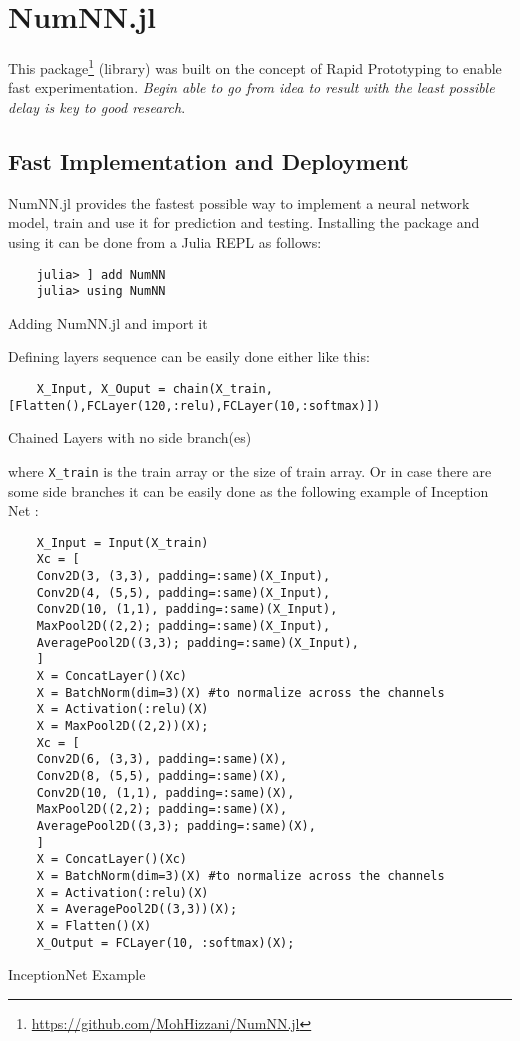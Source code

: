 \section{NumNN.jl}

This package\footnote{\href{https://github.com/MohHizzani/NumNN.jl}{https://github.com/MohHizzani/NumNN.jl}} (library) was built on the concept of Rapid Prototyping to enable fast experimentation. \emph{Begin able to go from idea to result with the least possible delay is key to good research}\cite{Keras}.

\subsection{Fast Implementation and Deployment}

NumNN.jl provides the fastest possible way to implement a neural network model, train and use it for prediction and testing. Installing the package and using it can be done from a Julia REPL as follows:

\begin{listing}[H]
	\begin{verbatim}
	julia> ] add NumNN
	julia> using NumNN
	\end{verbatim}
	\caption{Adding NumNN.jl and import it}\label{addimport}
\end{listing}

Defining layers sequence can be easily done either like this:

\begin{listing}[H]
	\begin{verbatim}
	X_Input, X_Ouput = chain(X_train,[Flatten(),FCLayer(120,:relu),FCLayer(10,:softmax)])
	\end{verbatim}
	\caption{Chained Layers with no side branch(es)}\label{chain}
\end{listing}


where \texttt{X_train} is the train array or the size of train array. Or in case there are some side branches it can be easily done as the following example of Inception Net \cite{Szegedy2016}:

\begin{listing}[H]
	\begin{verbatim}
	X_Input = Input(X_train)
	Xc = [
	Conv2D(3, (3,3), padding=:same)(X_Input),
	Conv2D(4, (5,5), padding=:same)(X_Input),
	Conv2D(10, (1,1), padding=:same)(X_Input),
	MaxPool2D((2,2); padding=:same)(X_Input),
	AveragePool2D((3,3); padding=:same)(X_Input),
	]
	X = ConcatLayer()(Xc)
	X = BatchNorm(dim=3)(X) #to normalize across the channels
	X = Activation(:relu)(X)
	X = MaxPool2D((2,2))(X);
	Xc = [
	Conv2D(6, (3,3), padding=:same)(X),
	Conv2D(8, (5,5), padding=:same)(X),
	Conv2D(10, (1,1), padding=:same)(X),
	MaxPool2D((2,2); padding=:same)(X),
	AveragePool2D((3,3); padding=:same)(X),
	]
	X = ConcatLayer()(Xc)
	X = BatchNorm(dim=3)(X) #to normalize across the channels
	X = Activation(:relu)(X)
	X = AveragePool2D((3,3))(X);
	X = Flatten()(X)
	X_Output = FCLayer(10, :softmax)(X);
	\end{verbatim}
	\caption{InceptionNet Example}\label{chain}
\end{listing}

